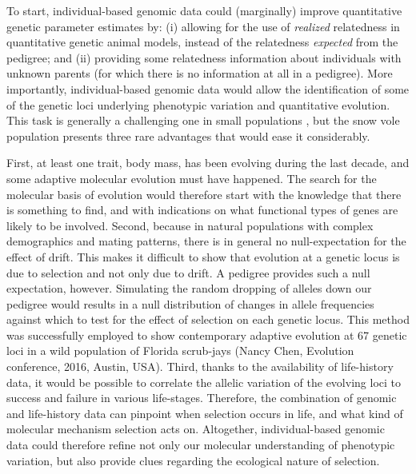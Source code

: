 To start, individual-based genomic data could (marginally) improve quantitative genetic parameter estimates \parencite{Berenos2014} by: (i) allowing for the use of \emph{realized} relatedness in quantitative genetic animal models, instead of the relatedness \emph{expected} from the pedigree; and (ii) providing some relatedness information about individuals with unknown parents (for which there is no information at all in a pedigree). 
More importantly, individual-based genomic data would allow the identification of some of the genetic loci underlying phenotypic variation and quantitative evolution.
This task is generally a challenging one in small populations \parencite{Wellenreuther2016}, but the snow vole population presents three rare advantages that would ease it considerably. 

First, at least one trait, body mass, has been evolving during the last decade, and some adaptive molecular evolution must have happened. The search for the molecular basis of evolution would therefore start with the knowledge that there is something to find, and with indications on what functional types of genes are likely to be involved. 
Second, because in natural populations with complex demographics and mating patterns, there is in general no null-expectation for the effect of drift. This makes it difficult to show that evolution at a genetic locus is due to selection and not only due to drift. A pedigree provides such a null expectation, however. Simulating the random dropping of alleles down our pedigree would results in a null distribution of changes in allele frequencies against which to test for the effect of selection on each genetic locus. This method was successfully employed to show contemporary adaptive evolution at 67 genetic loci in a wild population of Florida scrub-jays (Nancy Chen, Evolution conference, 2016, Austin, USA).
Third, thanks to the availability of life-history data, it would be possible to correlate the allelic variation of the evolving loci to success and failure in various life-stages.  
Therefore, the combination of genomic and life-history data can pinpoint when selection occurs in life, and what kind of molecular mechanism selection acts on.
Altogether, individual-based genomic data could therefore refine not only our molecular understanding of phenotypic variation, but also provide clues regarding the ecological nature of selection. 


